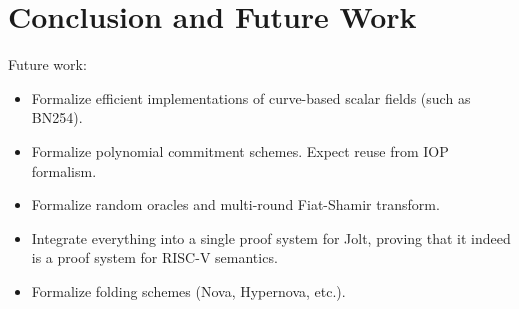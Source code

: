 \section{Conclusion and Future Work}

Future work:
\begin{itemize}
    \item Formalize efficient implementations of curve-based scalar fields (such as BN254).
    \item Formalize polynomial commitment schemes. Expect reuse from IOP formalism.
    \item Formalize random oracles and multi-round Fiat-Shamir transform.
    \item Integrate everything into a single proof system for Jolt, proving that it indeed is a proof system for RISC-V semantics.
    \item Formalize folding schemes (Nova, Hypernova, etc.).
\end{itemize}